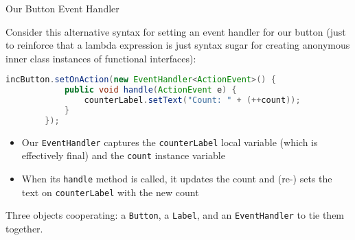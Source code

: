 \documentclass{beamer}
\begin{document}
\begin{frame}[fragile]{Our Button Event Handler}

Consider this alternative syntax for setting an event handler for our button (just to reinforce that a lambda expression is just syntax sugar for creating anonymous inner class instances of functional interfaces):
\begin{lstlisting}[language=Java]
        incButton.setOnAction(new EventHandler<ActionEvent>() {
            public void handle(ActionEvent e) {
                counterLabel.setText("Count: " + (++count));
            }
        });
\end{lstlisting}

\begin{itemize}
\item Our {\tt EventHandler} captures the {\tt counterLabel} local variable (which is effectively final) and the {\tt count} instance variable
\item When its {\tt handle} method is called, it updates the count and (re-) sets the text on {\tt counterLabel} with the new count
\end{itemize}
Three objects cooperating: a {\tt Button}, a {\tt Label}, and an {\tt EventHandler}  to tie them together.

\end{frame}

%
%
%
%
%
%
%
%
%
%
%
\end{document}
